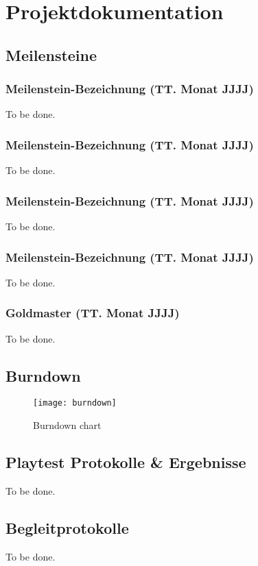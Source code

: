 \chapter{Projektdokumentation}

\section{Meilensteine}

\subsection{Meilenstein-Bezeichnung (TT. Monat JJJJ)}
To be done.

\subsection{Meilenstein-Bezeichnung (TT. Monat JJJJ)}
To be done.

\subsection{Meilenstein-Bezeichnung (TT. Monat JJJJ)}
To be done.

\subsection{Meilenstein-Bezeichnung (TT. Monat JJJJ)}
To be done.

\subsection{Goldmaster (TT. Monat JJJJ)}
To be done.

\section{Burndown}
\begin{figure}[H]
	\centering
	\texttt{[image: burndown]}
	\caption{Burndown chart}
\end{figure}

\section{Playtest Protokolle \& Ergebnisse}
To be done.
%

\section{Begleitprotokolle}
To be done.
%